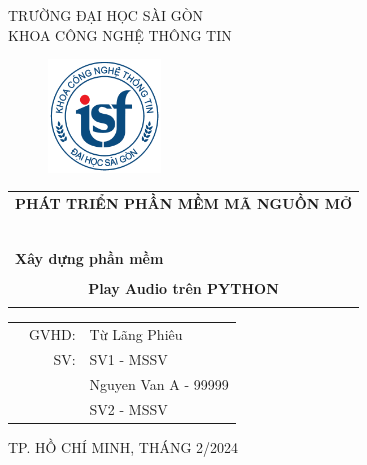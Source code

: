 \documentclass[a4paper]{article}
\begin{document}
\begin{titlepage}
\begin{center}
TRƯỜNG ĐẠI HỌC SÀI GÒN \\
KHOA CÔNG NGHỆ THÔNG TIN
\end{center}
\vspace{1cm}

\begin{figure}[h!]
\begin{center}
\includegraphics[width=3cm]{logoITSGU.png}
\end{center}
\end{figure}

\vspace{1cm}


\begin{center}
\begin{tabular}{c}
	\multicolumn{1}{l}{\textbf{{\Large PHÁT TRIỂN PHẦN MỀM MÃ NGUỒN MỞ}}}\\
	~~\\
	\hline
	\\
	\multicolumn{1}{l}{\textbf{{\Large Xây dựng phần mềm}}}\\
	\\
	
	\textbf{{\Huge Play Audio trên PYTHON}}\\
	\\
	\hline
\end{tabular}
\end{center}

\vspace{3cm}

\begin{table}[h]
\begin{tabular}{rrl}
\hspace{5 cm} & GVHD: &Từ Lãng Phiêu\\
& SV: & SV1 - MSSV\\
& & Nguyen Van A - 99999 \\
& & SV2 - MSSV \\
\end{tabular}
\vspace{1.5 cm}
\end{table}

\begin{center}

{\footnotesize TP. HỒ CHÍ MINH, THÁNG 2/2024}
\end{center}
\end{titlepage}
\end{document}
